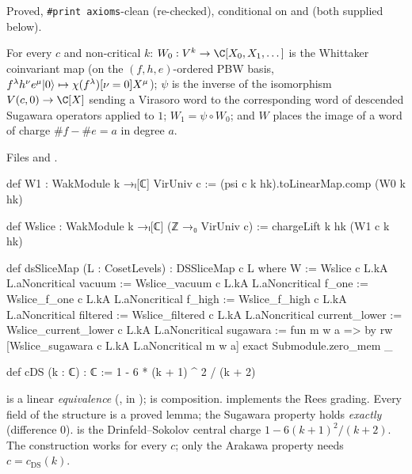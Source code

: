 \begin{status}
Proved, \texttt{\#print axioms}-clean (re-checked), conditional on  and  (both supplied below).
\end{status}

\begin{definition}\label{l29:def:dsslicemap}
For every $c$ and non-critical $k$: $W_0:V^k\to\C[X_0,X_1,\dots]$ is the Whittaker coinvariant map (on the
$(f,h,e)$-ordered PBW basis, $f^\lambda h^\nu e^\mu|0\rangle\mapsto\chi(f^\lambda)[\nu=0]X^\mu$); $\psi$ is the
inverse of the isomorphism $V(c,0)\to\C[X]$ sending a Virasoro word to the corresponding word of descended Sugawara
operators applied to $1$; $W_1=\psi\circ W_0$; and $W$ places the image of a word of charge $\#f-\#e=a$ in degree $a$.
\end{definition}

\noindent Files  and
.
\begin{leancode}
def W1 : WakModule k →ₗ[ℂ] VirUniv c := (psi c k hk).toLinearMap.comp (W0 k hk)

def Wslice : WakModule k →ₗ[ℂ] (ℤ →₀ VirUniv c) := chargeLift k hk (W1 c k hk)

def dsSliceMap (L : CosetLevels) : DSSliceMap c L where
  W := Wslice c L.kA L.aNoncritical
  vacuum := Wslice_vacuum c L.kA L.aNoncritical
  f_one := Wslice_f_one c L.kA L.aNoncritical
  f_high := Wslice_f_high c L.kA L.aNoncritical
  filtered := Wslice_filtered c L.kA L.aNoncritical
  current_lower := Wslice_current_lower c L.kA L.aNoncritical
  sugawara := fun m w a => by
    rw [Wslice_sugawara c L.kA L.aNoncritical m w a]
    exact Submodule.zero_mem _

def cDS (k : ℂ) : ℂ := 1 - 6 * (k + 1) ^ 2 / (k + 2)
\end{leancode}

\begin{dictionary}
 is a linear \emph{equivalence} (,  in
);  is composition.  implements the Rees
grading. Every field of the structure is a proved lemma; the Sugawara property holds \emph{exactly} (difference $0$).
 is the Drinfeld--Sokolov central charge $1-6(k+1)^2/(k+2)$. The construction works for every $c$; only the
Arakawa property needs $c=c_{\mathrm{DS}}(k)$.
\end{dictionary}

